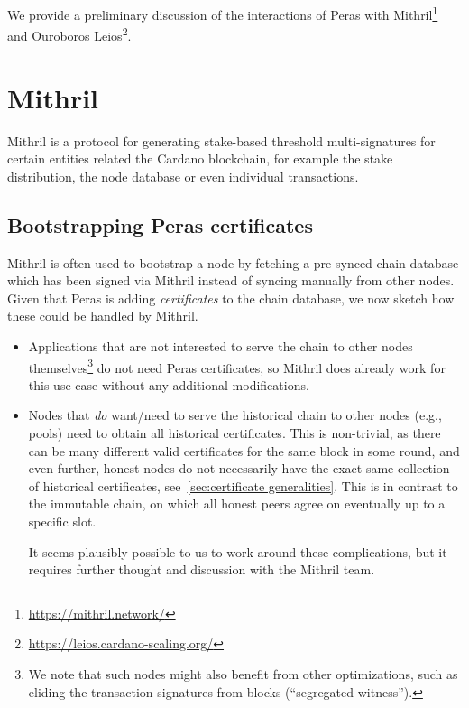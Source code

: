 We provide a preliminary discussion of the interactions of Peras with Mithril\footnote{\label{footnote:mithril}\url{https://mithril.network/}} and Ouroboros Leios\footnote{\label{footnote:leios}\url{https://leios.cardano-scaling.org/}}.

\section{Mithril}\label{sec:mithril}

Mithril is a protocol for generating stake-based threshold multi-signatures for certain entities related the Cardano blockchain, for example the stake distribution, the node database or even individual transactions.

\subsection{Bootstrapping Peras certificates}
Mithril is often used to bootstrap a node by fetching a pre-synced chain database which has been signed via Mithril instead of syncing manually from other nodes.
Given that Peras is adding \emph{certificates} to the chain database, we now sketch how these could be handled by Mithril.
\begin{itemize}
\item
  Applications that are not interested to serve the chain to other nodes themselves\footnote{
    We note that such nodes might also benefit from other optimizations, such as eliding the transaction signatures from blocks (\enquote{segregated witness}).}
  do not need Peras certificates, so Mithril does already work for this use case without any additional modifications.
\item
  Nodes that \emph{do} want/need to serve the historical chain to other nodes (e.g., pools) need to obtain all historical certificates.
  This is non-trivial, as there can be many different valid certificates for the same block in some round, and even further, honest nodes do not necessarily have the exact same collection of historical certificates, see~\cref{sec:certificate generalities}.
  This is in contrast to the immutable chain, on which all honest peers agree on eventually up to a specific slot.

  It seems plausibly possible to us to work around these complications, but it requires further thought and discussion with the Mithril team.
\end{itemize}

